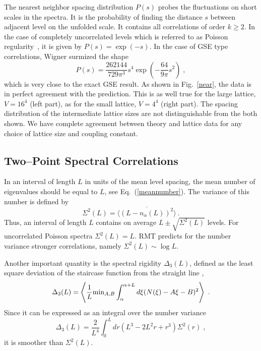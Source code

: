 The nearest neighbor spacing distribution $P(s)$ probes the
fluctuations on short scales in the spectra. It is the probability of
finding the distance $s$ between adjacent level on the unfolded scale.
It contains all correlations of order $k\ge 2$.  In the case of
completely uncorrelated levels which is referred to as Poisson
regularity~\cite{guhr97}, it is given by $P(s)=\exp(-s)$. In the case
of GSE type correlations, Wigner surmized the shape
\begin{equation}
P(s)=\frac{262144}{729\pi^3}s^4\exp\left(-\frac{64}{9\pi}s^2\right)\;,
\end{equation}
which is very close to the exact GSE result. As shown in
Fig.~\ref{near}, the data is in perfect agreement with the prediction.
This is as well true for the large lattice, $V=16^4$ (left part), as
for the small lattice, $V=4^4$ (right part). The spacing distribution
of the intermediate lattice sizes are not distinguishable from the
both shown. We have complete agreement between theory and lattice data
for any choice of lattice size and coupling constant.

\subsection{Two--Point Spectral Correlations}
\label{sec33}

In an interval of length $L$ in units of the mean level spacing, the
mean number of eigenvalues should be equal to $L$, see
Eq.~(\ref{meannumber}). The variance of this number is defined by
\cite{Mehta}
\begin{equation}
\Sigma^2(L)=\overline{\langle(L-n_{\alpha}(L))^2\rangle} \ .
\label{sigma}
\end{equation}
Thus, an interval of length $L$ contains on average
$L\pm\sqrt{\Sigma^2(L)}$ levels.  For uncorrelated Poisson spectra
$\Sigma^2(L)=L$. RMT predicts for the number variance stronger
correlations, namely $\Sigma^2(L)\sim \log L$. 

Another important quantity is the spectral rigidity $\Delta_3(L)$,
defined as the least square deviation of the staircase function from
the straight line \cite{Mehta},
\begin{equation}
  \Delta_3(L)=\left\langle\frac{1}{L}{\rm
    min}_{A,B}\int_{\alpha}^{\alpha+L}d\xi(N(\xi)-A\xi-B)^2
           \right\rangle \ .
\end{equation}
Since it can be expressed as an integral over the number variance
\begin{equation}
\Delta_3(L)=\frac{2}{L^4}\int_0^Ldr(L^3-2L^2r+r^3)\Sigma^2(r)\;,
\label{rigidity}
\end{equation}
it is smoother than $\Sigma^2(L)$.  

